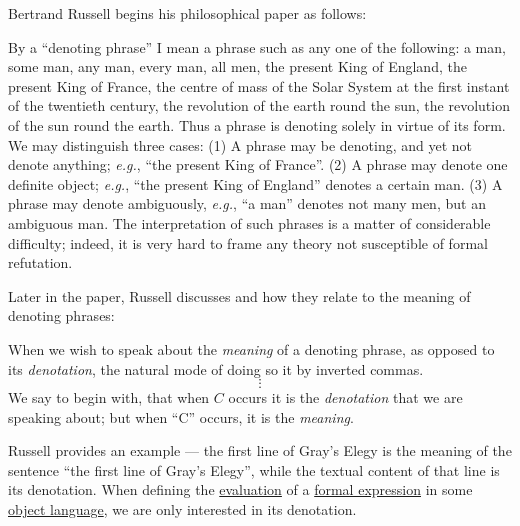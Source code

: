 \begin{concept}\label{con:description_operator}
  Bertrand Russell begins his philosophical paper \cite{Russell1905OnDenoting} as follows:
  \begin{displayquote}
    By a \enquote{denoting phrase} I mean a phrase such as any one of the following: a man, some man, any man, every man, all men, the present King of England, the present King of France, the centre of mass of the Solar System at the first instant of the twentieth century, the revolution of the earth round the sun, the revolution of the sun round the earth. Thus a phrase is denoting solely in virtue of its form. We may distinguish three cases: (1) A phrase may be denoting, and yet not denote anything; \textit{e.g.}, \enquote{the present King of France}. (2) A phrase may denote one definite object; \textit{e.g.}, \enquote{the present King of England} denotes a certain man. (3) A phrase may denote ambiguously, \textit{e.g.}, \enquote{a man} denotes not many men, but an ambiguous man. The interpretation of such phrases is a matter of considerable difficulty; indeed, it is very hard to frame any theory not susceptible of formal refutation.
  \end{displayquote}

  Later in the paper, Russell discusses  and how they relate to the meaning of denoting phrases:
  \begin{displayquote}
    When we wish to speak about the \textit{meaning} of a denoting phrase, as opposed to its \textit{denotation}, the natural mode of doing so it by inverted commas.
    \begin{equation*}
      \vdots
    \end{equation*}
    We say to begin with, that when \( C \) occurs it is the \textit{denotation} that we are speaking about; but when \enquote{C} occurs, it is the \textit{meaning}.
  \end{displayquote}

  Russell provides an example --- the first line of Gray's Elegy is the meaning of the sentence \enquote{the first line of Gray's Elegy}, while the textual content of that line is its denotation. When defining the \hyperref[con:evaluation]{evaluation} of a \hyperref[con:expression]{formal expression} in some \hyperref[con:metalogic]{object language}, we are only interested in its denotation.


\end{concept}
